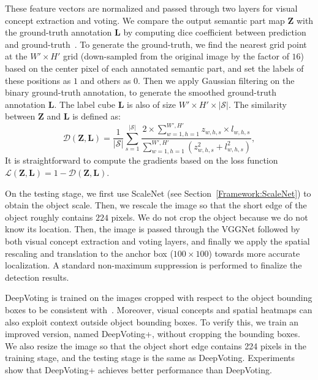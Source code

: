\documentclass[10pt,twocolumn,letterpaper]{article}
\begin{document}
  These feature vectors are normalized and passed through two layers for visual concept extraction and voting. We compare the output semantic part map $\mathbf{Z}$ with the ground-truth annotation $\mathbf{L}$ by computing dice coefficient between prediction and ground-truth~\cite{Milletari_2016_V}. To generate the ground-truth, we find the nearest grid point at the $W'\times H'$ grid (down-sampled from the original image by the factor of $16$) based on the center pixel of each annotated semantic part, and set the labels of these positions as $1$ and others as $0$. Then we apply Gaussian filtering on the binary ground-truth annotation, to generate the smoothed ground-truth annotation $\mathbf{L}$. The label cube $\mathbf{L}$ is also of size $W'\times H'\times\left|\mathcal{S}\right|$. The similarity between $\mathbf{Z}$ and $\mathbf{L}$ is defined as:
  \begin{equation}
  \label{Eqn:ProbPositive}
  {\mathcal{D}\!\left(\mathbf{Z},\mathbf{L}\right)}={\frac{1}{\left|\mathcal{S}\right|}{\sum_{s=1}^{\left|\mathcal{S}\right|}}\frac{2\times{\sum_{w=1,h=1}^{W',H'}}z_{w,h,s}\times l_{w,h,s}}{{\sum_{w=1,h=1}^{W',H'}}\left(z_{w,h,s}^2+l_{w,h,s}^2\right)}},
  \end{equation}
  It is straightforward to compute the gradients based on the loss function ${\mathcal{L}\!\left(\mathbf{Z},\mathbf{L}\right)}={1-\mathcal{D}\!\left(\mathbf{Z},\mathbf{L}\right)}$.

  On the testing stage, we first use ScaleNet (see Section~\ref{Framework:ScaleNet}) to obtain the object scale. Then, we rescale the image so that the short edge of the object roughly contains $224$ pixels. We do not crop the object because we do not know its location. Then, the image is passed through the VGGNet followed by both visual concept extraction and voting layers, and finally we apply the spatial rescaling and translation to the anchor box ($100\times100$) towards more accurate localization. A standard non-maximum suppression is performed to finalize the detection results.

  DeepVoting is trained on the images cropped with respect to the object bounding boxes to be consistent with~\cite{wang2017detecting}. Moreover, visual concepts and spatial heatmaps can also exploit context outside object bounding boxes. To verify this, we train an improved version, named DeepVoting+, without cropping the bounding boxes. We also resize the image so that the object short edge contains 224 pixels in the training stage, and the testing stage is the same as DeepVoting. Experiments show that DeepVoting+ achieves better performance than DeepVoting.
\end{document}
